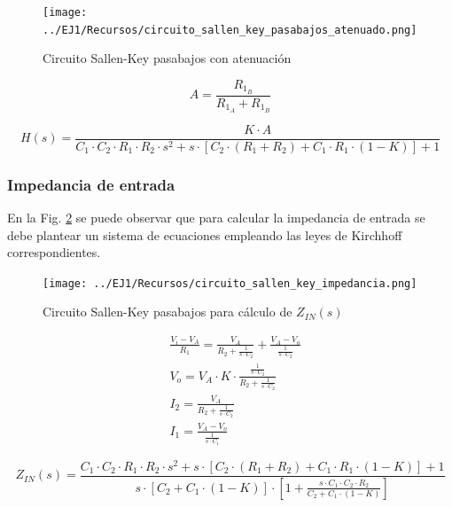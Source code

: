 \begin{figure}[H]
	\centering
	\texttt{[image: ../EJ1/Recursos/circuito\_sallen\_key\_pasabajos\_atenuado.png]}
	\caption{Circuito Sallen-Key pasabajos con atenuaci\'on}
	\label{fig:sallen_key_pasabajos_atenuado}
\end{figure}

\begin{equation}
A = \frac{R_{1_B}}{R_{1_A} + R_{1_B}}
\end{equation}

\begin{equation}
H(s) = \frac{K \cdot A}{C_1 \cdot C_2 \cdot R_1 \cdot R_2 \cdot s^{2} + s \cdot \left[ C_2 \cdot (R_1 + R_2) + C_1 \cdot R_1 \cdot (1 - K) \right] + 1}
\label{eq:sallen_key_h_atenuada}
\end{equation}

\subsubsection{Impedancia de entrada}
En la Fig. \ref{fig:circuito_sallen_key_impedancia_entrada_ideal} se puede observar que para calcular la impedancia de entrada se debe plantear un sistema de ecuaciones empleando 
las leyes de Kirchhoff correspondientes.

\begin{figure}[H]
	\centering
	\texttt{[image: ../EJ1/Recursos/circuito\_sallen\_key\_impedancia.png]}
	\caption{Circuito Sallen-Key pasabajos para c\'alculo de $Z_{IN}(s)$}
	\label{fig:circuito_sallen_key_impedancia_entrada_ideal}
\end{figure}

\begin{align*}
& \frac{V_i - V_A}{R_1} = \frac{V_A}{R_2 + \frac{1}{s \cdot C_2}} + \frac{V_A - V_o}{\frac{1}{s \cdot C_2}} \\
& V_o = V_A \cdot K \cdot \frac{\frac{1}{s \cdot C_2}}{R_2 + \frac{1}{s \cdot C_2}} \\
& I_2 = \frac{V_A}{R_2 + \frac{1}{s \cdot C_2}} \\
& I_1 = \frac{V_A - V_o}{\frac{1}{s \cdot C_1}}
\end{align*}

\begin{equation}
Z_{IN}(s) = \frac{C_1 \cdot C_2 \cdot R_1 \cdot R_2 \cdot s^{2} + s \cdot \left[ C_2 \cdot (R_1 + R_2) + C_1 \cdot R_1 \cdot (1 - K) \right] + 1}{s \cdot \left[C_2 + C_1 \cdot (1 - K) \right] \cdot \left[ 1 + \frac{s \cdot C_1 \cdot C_2 \cdot R_2}{C_2 + C_1 \cdot (1 - K)} \right]}
\label{eq:sallen_key_impedancia_entrada_ideal}
\end{equation}

